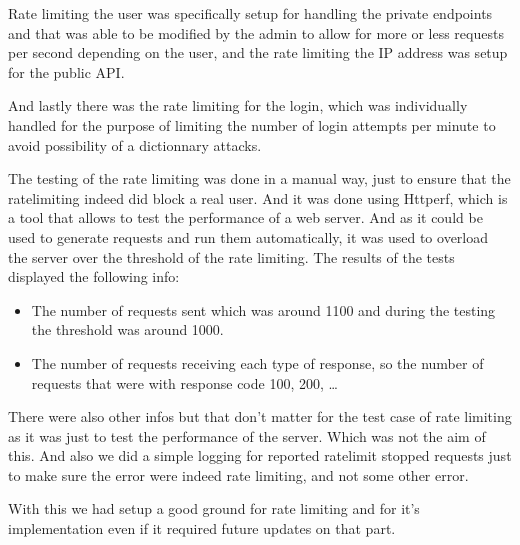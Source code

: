 Rate limiting the user was specifically setup for handling the private endpoints and that
was able to be modified by the admin to allow for more or less requests per second
depending on the user, and the rate limiting the IP address was setup for the public API.

And lastly there was the rate limiting for the login, which was individually handled for
the purpose of limiting the number of login attempts per minute to avoid possibility
of a dictionnary attacks.

The testing of the rate limiting was done in a manual way, just to ensure that the ratelimiting 
indeed did block a real user.
And it was done using Httperf, which is a tool that allows to test the performance of a
web server. And as it could be used to generate requests and run them automatically,
it was used to overload the server over the threshold of the rate limiting.
The results of the tests displayed the following info:
\begin{itemize}
    \item The number of requests sent which was around 1100 and during the testing the threshold was around 1000.
    \item The number of requests receiving each type of response, so the number of requests that were with response code 100, 200, \dots
\end{itemize}

There were also other infos but that don't matter for the test case of rate limiting
as it was just to test the performance of the server. Which was not the aim of this.
And also we did a simple logging for reported ratelimit stopped requests just to make sure
the error were indeed rate limiting, and not some other error.

With this we had setup a good ground for rate limiting and for it's implementation
even if it required future updates on that part.
